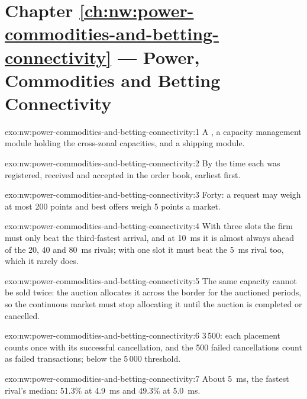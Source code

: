 \section*{Chapter \ref{ch:nw:power-commodities-and-betting-connectivity} --- Power, Commodities and Betting Connectivity}

\begin{solution}{exo:nw:power-commodities-and-betting-connectivity:1}
A , a capacity management module holding the cross-zonal capacities, and a shipping module.
\end{solution}

\begin{solution}{exo:nw:power-commodities-and-betting-connectivity:2}
By the time each was registered, received and accepted in the order book, earliest first.
\end{solution}

\begin{solution}{exo:nw:power-commodities-and-betting-connectivity:3}
Forty: a request may weigh at most 200 points and best offers weigh 5 points a market.
\end{solution}

\begin{solution}{exo:nw:power-commodities-and-betting-connectivity:4}
With three slots the firm must only beat the third-fastest arrival, and at \qty{10}{\milli\second} it is almost always ahead of the 20,
40 and \qty{80}{\milli\second} rivals; with one slot it must beat the \qty{5}{\milli\second} rival too, which it rarely does.
\end{solution}

\begin{solution}{exo:nw:power-commodities-and-betting-connectivity:5}
The same capacity cannot be sold twice: the auction allocates it across the border for the auctioned periods, so the continuous market
must stop allocating it until the auction is completed or cancelled.
\end{solution}

\begin{solution}{exo:nw:power-commodities-and-betting-connectivity:6}
3\,500: each placement counts once with its successful cancellation, and the 500 failed cancellations count as failed transactions;
below the 5\,000 threshold.
\end{solution}

\begin{solution}{exo:nw:power-commodities-and-betting-connectivity:7}
About \qty{5}{\milli\second}, the fastest rival's median: 51.3\% at \qty{4.9}{\milli\second} and 49.3\% at \qty{5.0}{\milli\second}.
\end{solution}

